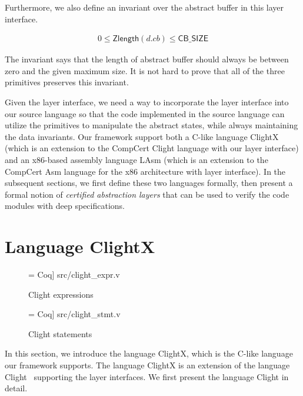 Furthermore, we also define an invariant over the abstract buffer
in this layer interface.

\begin{invariant}
\begin{align*}
0 \leq \textsf{Zlength} (d.cb) \leq \textsf{CB\_SIZE}
\end{align*}
\end{invariant}

The invariant says that the length of abstract buffer should always
be between zero and the given maximum size.
It is not hard to prove that all of the three primitives preserves
this invariant.

Given the layer interface, we need a way to incorporate the layer interface
into our source language so that the code implemented in the source language
can utilize the primitives to manipulate the abstract states, while always
maintaining the data invariants. Our framework support both a C-like
language ClightX (which is an extension to the CompCert Clight language
with our layer interface) and an x86-based assembly language LAsm
(which is an extension to the CompCert Asm language for the x86
architecture with layer interface). In the subsequent sections,
we first define these two languages formally, then present
a formal notion of {\em certified abstraction layers} that can be used
to verify the code modules with deep specifications.



\section{Language ClightX}

\begin{figure}
 = Coq] {src/clight_expr.v}
\caption{Clight expressions}
\label{fig:clight_expr}
\end{figure}

\begin{figure}
 = Coq] {src/clight_stmt.v}
\caption{Clight statements}
\label{fig:clight_stmt}
\end{figure}

In this section, we introduce the language ClightX, which is the C-like
language our framework supports. 
The language ClightX is an extension of the language Clight~\cite{blazy-leroy-clight}
supporting the layer interfaces. We first present the language Clight in detail.

